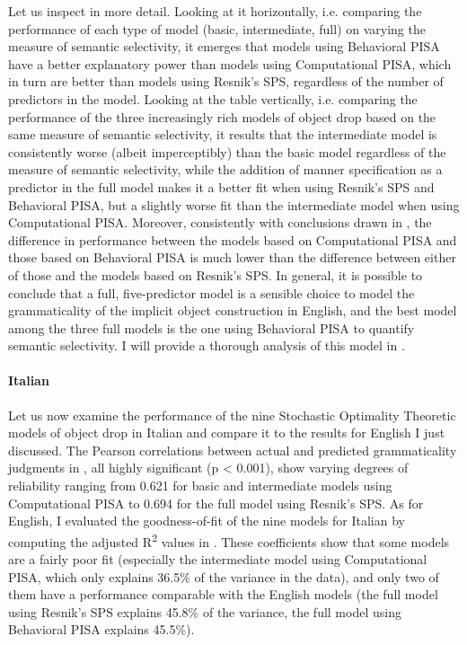 Let us inspect  in more detail. Looking at it horizontally, i.e. comparing the performance of each type of model (basic, intermediate, full) on varying the measure of semantic selectivity, it emerges that models using Behavioral PISA have a better explanatory power than models using Computational PISA, which in turn are better than models using Resnik's SPS, regardless of the number of predictors in the model. Looking at the table vertically, i.e. comparing the performance of the three increasingly rich models of object drop based on the same measure of semantic selectivity, it results that the intermediate model is consistently worse (albeit imperceptibly) than the basic model regardless of the measure of semantic selectivity, while the addition of manner specification as a predictor in the full model makes it a better fit when using Resnik's SPS and Behavioral PISA, but a slightly worse fit than the intermediate model when using Computational PISA. Moreover, consistently with conclusions drawn in , the difference in performance between the models based on Computational PISA and those based on Behavioral PISA is much lower than the difference between either of those and the models based on Resnik's SPS. In general, it is possible to conclude that a full, five-predictor model is a sensible choice to model the grammaticality of the implicit object construction in English, and the best model among the three full models is the one using Behavioral PISA to quantify semantic selectivity. I will provide a thorough analysis of this model in .

\paragraph{Italian} Let us now examine the performance of the nine Stochastic Optimality Theoretic models of object drop in Italian and compare it to the results for English I just discussed. The Pearson correlations between actual and predicted grammaticality judgments in , all highly significant (p < 0.001), show varying degrees of reliability ranging from 0.621 for basic and intermediate models using Computational PISA to 0.694 for the full model using Resnik's SPS. As for English, I evaluated the goodness-of-fit of the nine models for Italian by computing the adjusted R\textsuperscript{2} values in . These coefficients show that some models are a fairly poor fit (especially the intermediate model using Computational PISA, which only explains 36.5\% of the variance in the data), and only two of them have a performance comparable with the English models (the full model using Resnik's SPS explains 45.8\% of the variance, the full model using Behavioral PISA explains 45.5\%).

